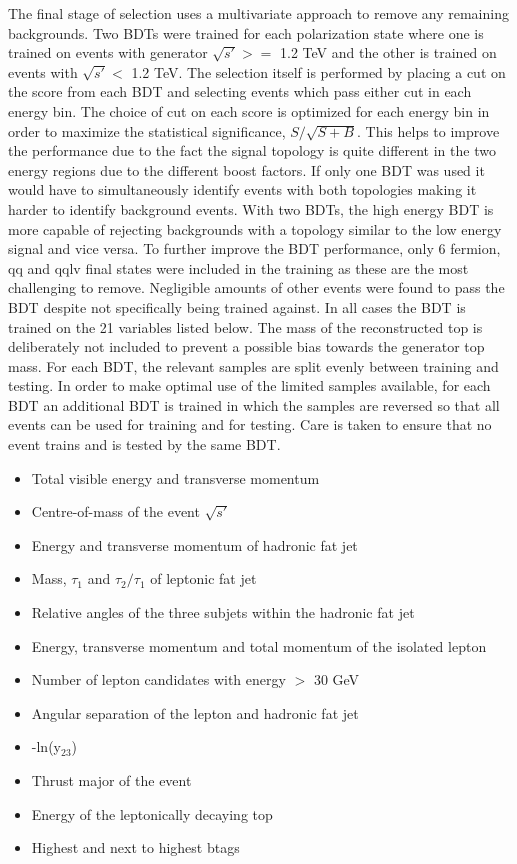 The final stage of selection uses a multivariate approach to remove any remaining backgrounds. Two \ac{BDT}s were trained for each polarization state where one is trained on events with generator $\sqrt{s'} >=$ 1.2 TeV and the other is trained on events with  $\sqrt{s'} <$ 1.2 TeV. The selection itself is performed by placing a cut on the score from each \ac{BDT} and selecting events which pass either cut in each energy bin. The choice of cut on each score is optimized for each energy bin in order to maximize the statistical significance, $S/\sqrt{S+B}$. This helps to improve the performance due to the fact the signal topology is quite different in the two energy regions due to the different boost factors. If only one \ac{BDT} was used it would have to simultaneously identify events with both topologies making it harder to identify background events. With two \ac{BDT}s, the high energy \ac{BDT} is more capable of rejecting backgrounds with a topology similar to the low energy signal and vice versa. To further improve the \ac{BDT} performance, only 6 fermion, qq and qqlv final states were included in the training as these are the most challenging to remove.  Negligible amounts of other events were found to pass the \ac{BDT} despite not specifically being trained against. In all cases the BDT is trained on the 21 variables listed below. The mass of the reconstructed top is deliberately not included to prevent a possible bias towards the generator top mass. For each \ac{BDT}, the relevant samples are split evenly between training and testing. In order to make optimal use of the limited samples available, for each \ac{BDT} an additional \ac{BDT} is trained in which the samples are reversed so that all events can be used for training and for testing. Care is taken to ensure that no event trains and is tested by the same \ac{BDT}.

\begin{itemize}
\item Total visible energy and transverse momentum
\item Centre-of-mass of the event $\sqrt{s'}$
\item Energy and transverse momentum of hadronic fat jet
\item Mass, $\tau_1$ and $\tau_2/\tau_1$ of leptonic fat jet
\item Relative angles of the three subjets within the hadronic fat jet
\item Energy, transverse momentum and total momentum of the isolated lepton
\item Number of lepton candidates with energy $>$ 30 GeV
\item Angular separation of the lepton and hadronic fat jet
\item -ln(y$_{23}$)
\item Thrust major of the event
\item Energy of the leptonically decaying top
\item Highest and next to highest btags
\end{itemize}

